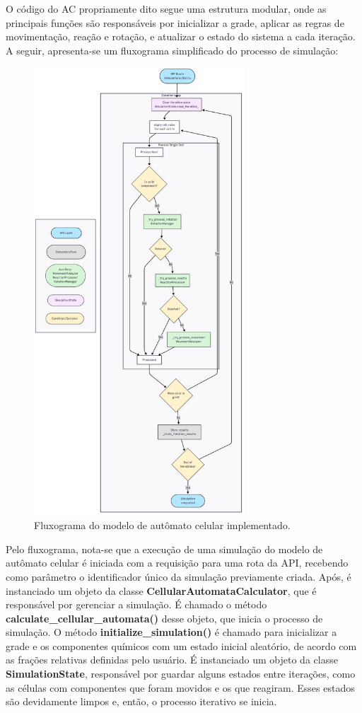 \documentclass[12pt,oneside]{report}
\begin{document}
O código do AC propriamente dito segue uma estrutura modular, onde as principais funções são responsáveis por inicializar a grade, aplicar as regras de movimentação, reação e rotação, e atualizar o estado do sistema a cada iteração. A seguir, apresenta-se um fluxograma simplificado do processo de simulação:

\begin{figure}[H]
    \centering
    \includegraphics[width=0.7\textwidth]{img/fluxograma.png}
    \caption{Fluxograma do modelo de autômato celular implementado.}
    \label{fig:fluxograma}
\end{figure}

Pelo fluxograma, nota-se que a execução de uma simulação do modelo de autômato celular é iniciada com a requisição para uma rota da API, recebendo como parâmetro o identificador único da simulação previamente criada. Após, é instanciado um objeto da classe \textbf{CellularAutomataCalculator}, que é responsável por gerenciar a simulação. É chamado o método \textbf{calculate\_cellular\_automata()} desse objeto, que inicia o processo de simulação. O método \textbf{initialize\_simulation()} é chamado para inicializar a grade e os componentes químicos com um estado inicial aleatório, de acordo com as frações relativas definidas pelo usuário. É instanciado um objeto da classe \textbf{SimulationState}, responsável por guardar alguns estados entre iterações, como as células com componentes que foram movidos e os que reagiram. Esses estados são devidamente limpos e, então, o processo iterativo se inicia.
\end{document}
